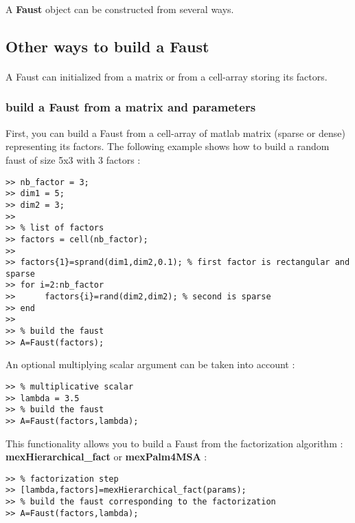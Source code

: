 A \textbf{Faust} object can be constructed from several ways.

\subsection{Other ways to build a Faust}\label{sec:firstUseBuildFromCellArray}
\paragraph{} A Faust can initialized from a matrix or from a cell-array storing its factors.

\subsubsection{build a Faust from a matrix and parameters}\label{sec:firstUseBuildFromMatrix}
First, you can build a Faust from a cell-array of matlab matrix (sparse or dense) representing its factors.
\newline
\newline
The following example shows how to build a random faust of size 5x3 with 3 factors :

\begin{lstlisting}
>> nb_factor = 3;
>> dim1 = 5;
>> dim2 = 3; 
>>
>> % list of factors
>> factors = cell(nb_factor);
>>
>> factors{1}=sprand(dim1,dim2,0.1); % first factor is rectangular and sparse 
>> for i=2:nb_factor
>> 		factors{i}=rand(dim2,dim2); % second is sparse
>> end
>>
>> % build the faust
>> A=Faust(factors);
\end{lstlisting}
\newpage

An optional multiplying scalar argument can be taken into account  :
\begin{lstlisting}
>> % multiplicative scalar
>> lambda = 3.5 
>> % build the faust
>> A=Faust(factors,lambda);
\end{lstlisting}

This functionality allows you to build a Faust from the factorization algorithm :
\textbf{mexHierarchical{\_}fact} or \textbf{mexPalm4MSA} :
\begin{lstlisting}
>> % factorization step
>> [lambda,factors]=mexHierarchical_fact(params);
>> % build the faust corresponding to the factorization
>> A=Faust(factors,lambda);
\end{lstlisting}


 
